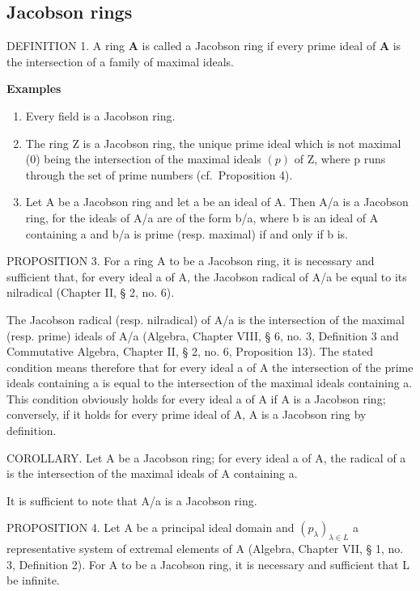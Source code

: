 \subsection{Jacobson rings}

DEFINITION 1. A ring \(\mathbf{A}\) is called a Jacobson ring if every prime ideal of \(\mathbf{A}\) is the intersection of a family of maximal ideals.

\textbf{Examples}\par

\begin{enumerate}
\def\labelenumi{(\arabic{enumi})}
\item
  Every field is a Jacobson ring.
\item
  The ring Z is a Jacobson ring, the unique prime ideal which is not maximal (0) being the intersection of the maximal ideals \((p)\) of Z, where p runs through the set of prime numbers (cf.~Proposition 4).
\item
  Let A be a Jacobson ring and let a be an ideal of A. Then A/a is a Jacobson ring, for the ideals of A/a are of the form b/a, where b is an ideal of A containing a and b/a is prime (resp. maximal) if and only if b is.
\end{enumerate}

PROPOSITION 3. For a ring A to be a Jacobson ring, it is necessary and sufficient that, for every ideal a of A, the Jacobson radical of A/a be equal to its nilradical (Chapter II, § 2, no. 6).

The Jacobson radical (resp. nilradical) of A/a is the intersection of the maximal (resp. prime) ideals of A/a (Algebra, Chapter VIII, § 6, no. 3, Definition 3 and Commutative Algebra, Chapter II, § 2, no. 6, Proposition 13). The stated condition means therefore that for every ideal a of A the intersection of the prime ideals containing a is equal to the intersection of the maximal ideals containing a. This condition obviously holds for every ideal a of A if A is a Jacobson ring; conversely, if it holds for every prime ideal of A, A is a Jacobson ring by definition.

COROLLARY. Let A be a Jacobson ring; for every ideal a of A, the radical of a is the intersection of the maximal ideals of A containing a.

It is sufficient to note that A/a is a Jacobson ring.

PROPOSITION 4. Let A be a principal ideal domain and \((p_{\lambda})_{\lambda \in L}\) a representative system of extremal elements of A (Algebra, Chapter VII, § 1, no. 3, Definition 2). For A to be a Jacobson ring, it is necessary and sufficient that L be infinite.

